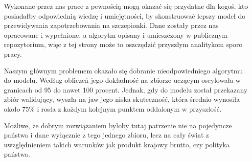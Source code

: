 \documentclass[12pt, oneside]{article}
\begin{document}
Wykonane przez nas prace z pewnością mogą okazać się przydatne dla kogoś, kto posiadałby odpowiednią wiedzę i umiejętności, by skonstruować lepszy model do przewidywania zapotrzebowania na szczepionki. Dane zostały przez nas opracowane i wypełnione, a algorytm opisany i umieszczony w publicznym repozytorium, więc z tej strony może to oszczędzić przyszłym analitykom sporo pracy. 

Naszym głównym problemem okazało się dobranie nieodpowiedniego algorytmu do modelu. Według obliczeń jego dokładność na  zbiorze uczącym oscylowała w granicach od 95 do nawet 100 procent. Jednak, gdy do modelu został przekazany zbiór walidujący, wyszła na jaw jego niska skuteczność, która średnio wynosiła około 75\% i rosła z każdym kolejnym punktem oddalonym w przyszłość. 

Możliwe, że dobrym rozwiązaniem byłoby tutaj patrzenie nie na pojedyncze państwa i dane wyłącznie z tego jednego zbioru, lecz na cały świat z uwzględnieniem takich warunków jak produkt krajowy brutto, czy polityka państwa.
\end{document}
